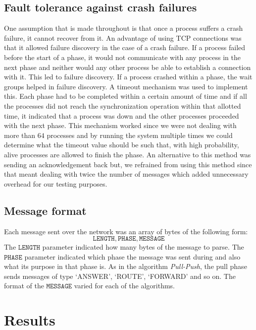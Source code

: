 \subsection{Fault tolerance against crash failures}
One assumption that is made throughout is that once a process suffers a crash failure, it cannot recover from it. An advantage of using TCP connections was that it allowed failure discovery in the case of a crash failure. If a process failed before the start of a phase, it would not communicate with any process in the next phase and neither would any other process be able to establish a connection with it. This led to failure discovery. If a process crashed within a phase, the wait groups helped in failure discovery. A timeout mechanism was used to implement this. Each phase had to be completed within a certain amount of time and if all the processes did not reach the synchronization operation within that allotted time, it indicated that a process was down and the other processes proceeded with the next phase. This mechanism worked since we were not dealing with more than $64$ processes and by running the system multiple times we could determine what the timeout value should be such that, with high probability, alive processes are allowed to finish the phase. An alternative to this method was sending an acknowledgement back but, we refrained from using this method since that meant dealing with twice the number of messages which added unnecessary overhead for our testing purposes. 

\subsection{Message format}
Each message sent over the network was an array of bytes of the following form:
\begin{equation*}
    \mathtt{LENGTH}, \mathtt{PHASE}, \mathtt{MESSAGE}
\end{equation*}
The $\mathtt{LENGTH}$ parameter indicated how many bytes of the message to parse. The $\mathtt{PHASE}$ parameter indicated which phase the message was sent during and also what its purpose in that phase is. As in the algorithm \textit{Pull-Push}, the pull phase sends messages of type `ANSWER', `ROUTE', `FORWARD' and so on. The format of the $\mathtt{MESSAGE}$ varied for each of the algorithms.


\section{Results}
\label{sec:results}

